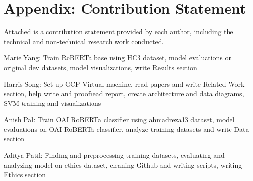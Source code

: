 \documentclass[11pt]{article}
\begin{document}
\appendix
\newpage
\thispagestyle{empty} 
\section{Appendix: Contribution Statement}
Attached is a contribution statement provided by each author, including the technical and non-technical research work conducted. 

Marie Yang: Train RoBERTa base using HC3 dataset, model evaluations on original dev datasets, model visualizations, write Results section

Harris Song: Set up GCP Virtual machine, read papers and write Related Work section, help write and proofread report, create architecture and data diagrams, SVM training and visualizations

Anish Pal: Train OAI RoBERTa classifier using ahmadreza13 dataset, model evaluations on OAI RoBERTa classifier, analyze training datasets and write Data section

Aditya Patil: Finding and preprocessing training datasets, evaluating and analyzing model on ethics dataset, cleaning Github and writing scripts, writing Ethics section
\thispagestyle{empty}





\appendix
\end{document}
